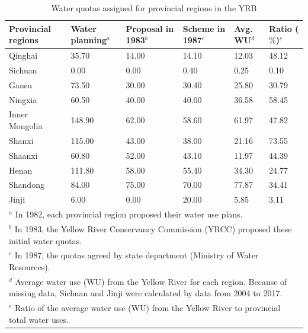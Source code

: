 \documentclass[preprint, 12pt]{elsarticle}
\begin{document}
\begin{table}[htbp]\footnotesize
	\centering
	\caption{Water quotas assigned for provincial regions in the YRB}\label{tab:quota}
	  \begin{tabularx}{\textwidth}{p{3cm}XXXXX}
	  \toprule
	  Provincial regions & \multicolumn{1}{l}{Water planning$^a$} & \multicolumn{1}{l}{Proposal in 1983$^b$} & \multicolumn{1}{l}{Scheme in 1987$^c$} & \multicolumn{1}{l}{Avg. WU$^d$} & \multicolumn{1}{l}{Ratio ($\%$)$^e$} \\
	  \midrule
	  Qinghai & 35.70  & 14.00  & 14.10  & 12.03  & 48.12  \\
	  Sichuan & 0.00  & 0.00  & 0.40  & 0.25  & 0.10  \\
	  Gansu & 73.50  & 30.00  & 30.40  & 25.80  & 30.79  \\
	  Ningxia & 60.50  & 40.00  & 40.00  & 36.58  & 58.45  \\
	  Inner Mongolia & 148.90  & 62.00  & 58.60  & 61.97  & 47.82  \\
	  Shanxi & 115.00  & 43.00  & 38.00  & 21.16  & 73.55  \\
	  Shaanxi & 60.80  & 52.00  & 43.10  & 11.97  & 44.39  \\
	  Henan & 111.80  & 58.00  & 55.40  & 34.30  & 24.77  \\
	  Shandong & 84.00  & 75.00  & 70.00  & 77.87  & 34.41  \\
	  Jinji & 6.00  & 0.00  & 20.00  & 5.85  & 3.11  \\
	  \bottomrule
	  \multicolumn{6}{p{\textwidth}}{$^a$ In 1982, each provincial region proposed their water use plans.}\\
	  \multicolumn{6}{p{\textwidth}}{$^b$ In 1983, the Yellow River Conservancy Commission (YRCC) proposed these initial water quotas.}\\
	  \multicolumn{6}{p{\textwidth}}{$^c$ In 1987, the quotas agreed by state department (Ministry of Water Resources).}\\
	  \multicolumn{6}{p{\textwidth}}{$^d$ Average water use (WU) from the Yellow River for each region. Because of missing data, Sichuan and Jinji were calculated by data from 2004 to 2017.}\\
	  \multicolumn{6}{p{\textwidth}}{$^e$ Ratio of the average water use (WU) from the Yellow River to provincial total water uses.}\\
	  \end{tabularx}\\
\end{table}%
\end{document}

